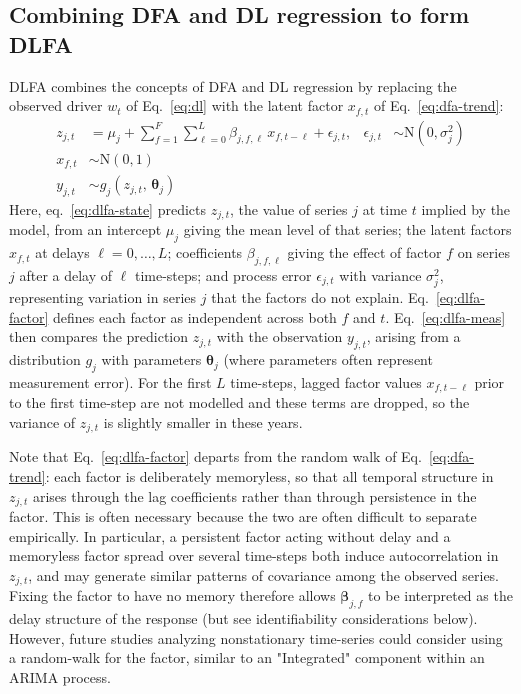 \documentclass[12pt]{article}
\begin{document}
\subsection{Combining DFA and DL regression to form DLFA}
\label{sec:combining}
DLFA combines the concepts of DFA and DL regression by replacing the
observed driver $w_t$ of Eq.~\ref{eq:dl} with the latent factor
$x_{f,t}$ of Eq.~\ref{eq:dfa-trend}:
\begin{align}
  z_{j,t} &= \mu_j + \sum_{f=1}^{F}\sum_{\ell=0}^{L}
             \beta_{j,f,\ell}\, x_{f,t-\ell} + \epsilon_{j,t},
  &\epsilon_{j,t} &\sim \mathrm{N}\!\left(0,\sigma_j^2\right)
  \label{eq:dlfa-state} \\
  x_{f,t} &\sim \mathrm{N}(0,1)
  \label{eq:dlfa-factor} \\
  y_{j,t} &\sim g_j\!\left(z_{j,t},\, \boldsymbol\theta_j\right)
  \label{eq:dlfa-meas}
\end{align}
Here, eq.~\ref{eq:dlfa-state} predicts $z_{j,t}$, the value of series
$j$ at time $t$ implied by the model, from an intercept $\mu_j$ giving
the mean level of that series; the latent factors $x_{f,t}$ at delays
$\ell = 0,\dots,L$; coefficients $\beta_{j,f,\ell}$ giving the effect of
factor $f$ on series $j$ after a delay of $\ell$ time-steps; and process
error $\epsilon_{j,t}$ with variance $\sigma_j^2$, representing
variation in series $j$ that the factors do not explain.
Eq.~\ref{eq:dlfa-factor} defines each factor as independent across both
$f$ and $t$. Eq.~\ref{eq:dlfa-meas} then compares the prediction
$z_{j,t}$ with the observation $y_{j,t}$, arising from a distribution
$g_j$ with parameters $\boldsymbol\theta_j$ (where parameters often
represent measurement error). For the first $L$ time-steps,
lagged factor values $x_{f,t-\ell}$ prior to the first time-step are
not modelled and these terms are dropped, so the variance of $z_{j,t}$
is slightly smaller in these years.

Note that Eq.~\ref{eq:dlfa-factor} departs from the random walk of
Eq.~\ref{eq:dfa-trend}: each factor is deliberately memoryless, so that
all temporal structure in $z_{j,t}$ arises through the lag coefficients
rather than through persistence in the factor. This is often necessary
because the two are often difficult to separate empirically. In
particular, a persistent factor acting without delay and a memoryless
factor spread over several time-steps both induce autocorrelation in
$z_{j,t}$, and may generate similar patterns of covariance among the
observed series. Fixing the factor to have no memory therefore allows
$\boldsymbol\beta_{j,f}$ to be interpreted as the delay structure of
the response (but see identifiability considerations below). However, future studies analyzing nonstationary
time-series could consider using a random-walk for the factor, similar
to an "Integrated" component within an ARIMA process.
\end{document}

